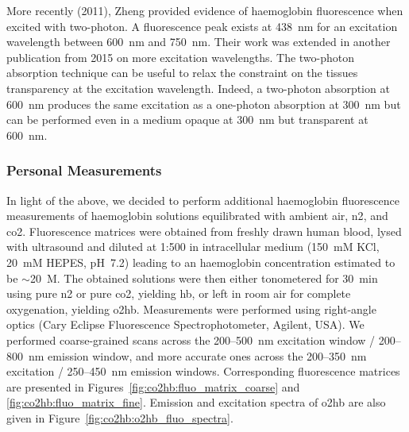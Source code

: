 More recently (2011), Zheng \etal{}\cite{zheng2011} provided evidence of haemoglobin fluorescence when excited with two-photon. A fluorescence peak exists at 438~nm for an excitation wavelength between 600~nm and 750~nm. Their work was extended in another publication from 2015\cite{sun2015} on more excitation wavelengths. The two-photon absorption technique can be useful to relax the constraint on the tissues transparency at the excitation wavelength. Indeed, a two-photon absorption at 600~nm produces the same excitation as a one-photon absorption at 300~nm but can be performed even in a medium opaque at 300~nm but transparent at 600~nm.

\subsubsection{Personal Measurements}

In light of the above, we decided to perform additional haemoglobin fluorescence measurements of haemoglobin solutions equilibrated with ambient air, \gls{n2}, and \gls{co2}. Fluorescence matrices were obtained from freshly drawn human blood, lysed with ultrasound and diluted at 1:500 in intracellular medium (150~mM KCl, 20~mM HEPES, pH~7.2) leading to an haemoglobin concentration estimated to be $\sim$20~\textmu{}M. The obtained solutions were then either tonometered for 30~min using pure \gls{n2} or pure \gls{co2}, yielding \gls{hb}, or left in room air for complete oxygenation, yielding \gls{o2hb}. Measurements were performed using right-angle optics (Cary Eclipse Fluorescence Spectrophotometer, Agilent, USA). We performed coarse-grained scans across the 200--500~nm excitation window / 200--800~nm emission window, and more accurate ones across the 200--350~nm excitation / 250--450~nm emission windows. Corresponding fluorescence matrices are presented in Figures~\ref{fig:co2hb:fluo_matrix_coarse} and \ref{fig:co2hb:fluo_matrix_fine}. Emission and excitation spectra of \gls{o2hb} are also given in Figure~\ref{fig:co2hb:o2hb_fluo_spectra}.

